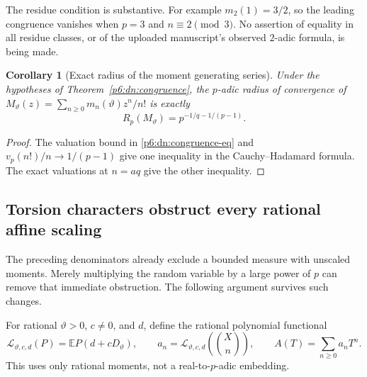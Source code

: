 \documentclass[11pt,a4paper]{article}
\newtheorem{corollary}[theorem]{Corollary}
\theoremstyle{definition}
\theoremstyle{remark}
\numberwithin{equation}{section}
\begin{document}
The residue condition is substantive.  For example
$m_2(1)=3/2$, so the leading congruence vanishes when
$p=3$ and $n\equiv2\pmod3$.  No assertion of equality in all
residue classes, or of the uploaded manuscript's observed
$2$-adic formula, is being made.

\begin{corollary}[Exact radius of the moment generating series]
\label{p6:dn:radius}
Under the hypotheses of Theorem~\ref{p6:dn:congruence}, the $p$-adic
radius of convergence of
$M_\vartheta(z)=\sum_{n\ge0}m_n(\vartheta)z^n/n!$ is exactly
\[
 R_p(M_\vartheta)=p^{-1/q-1/(p-1)}.
\]
\end{corollary}
\begin{proof}
The valuation bound in \eqref{p6:dn:congruence-eq} and
$v_p(n!)/n\to1/(p-1)$ give one inequality in the
Cauchy--Hadamard formula.  The exact valuations at $n=aq$ give
the other inequality.
\end{proof}

\subsection{Torsion characters obstruct every rational affine scaling}

The preceding denominators already exclude a bounded measure with
unscaled moments.  Merely multiplying the random variable by a large
power of $p$ can remove that immediate obstruction.  The following
argument survives such changes.

For rational $\vartheta>0$, $c\ne0$, and $d$, define the rational
polynomial functional
\[
 \mathcal L_{\vartheta,c,d}(P)=\mathbb E P(d+cD_\vartheta),
 \qquad
 a_n=\mathcal L_{\vartheta,c,d}\left(\binom Xn\right),
 \qquad A(T)=\sum_{n\ge0}a_nT^n.
\]
This uses only rational moments, not a real-to-$p$-adic embedding.
\end{document}
